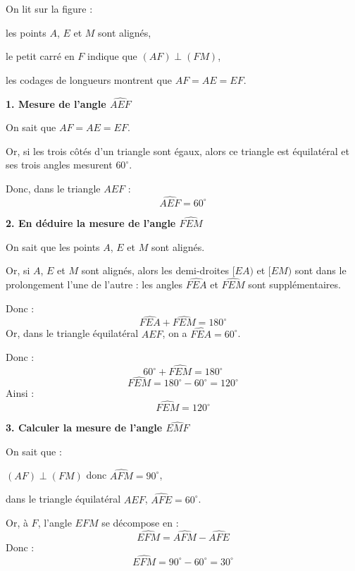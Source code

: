 \documentclass[answers]{exam}
\begin{document}
\begin{solution}

On lit sur la figure :
\begin{compactitem}
\item les points $A$, $E$ et $M$ sont alignés,
\item le petit carré en $F$ indique que $(AF)\perp(FM)$,
\item les codages de longueurs montrent que $AF=AE=EF$.
\end{compactitem}

\medskip

\textbf{1. Mesure de l'angle $\widehat{AEF}$}

On sait que $AF=AE=EF$.

Or, si les trois côtés d'un triangle sont égaux, alors ce triangle est équilatéral et ses trois angles mesurent $60^\circ$.

Donc, dans le triangle $AEF$ :
\[
\boxed{\widehat{AEF}=60^\circ}
\]

\medskip

\textbf{2. En déduire la mesure de l'angle $\widehat{FEM}$}

On sait que les points $A$, $E$ et $M$ sont alignés.

Or, si $A$, $E$ et $M$ sont alignés, alors les demi-droites $[EA)$ et $[EM)$ sont dans le prolongement l'une de l'autre : les angles $\widehat{FEA}$ et $\widehat{FEM}$ sont supplémentaires.

Donc :
\[
\widehat{FEA} + \widehat{FEM} = 180^\circ
\]
Or, dans le triangle équilatéral $AEF$, on a $\widehat{FEA}=60^\circ$.

Donc :
\[
60^\circ + \widehat{FEM} = 180^\circ
\]
\[
\widehat{FEM} = 180^\circ - 60^\circ = 120^\circ
\]
Ainsi :
\[
\boxed{\widehat{FEM}=120^\circ}
\]

\medskip

\textbf{3. Calculer la mesure de l'angle $\widehat{EMF}$}

On sait que :
\begin{compactitem}
\item $(AF)\perp(FM)$ donc $\widehat{AFM}=90^\circ$,
\item dans le triangle équilatéral $AEF$, $\widehat{AFE}=60^\circ$.
\end{compactitem}

Or, à $F$, l'angle $\widehat{EFM}$ se décompose en :
\[
\widehat{EFM} = \widehat{AFM} - \widehat{AFE}
\]
Donc :
\[
\widehat{EFM} = 90^\circ - 60^\circ = 30^\circ
\]


\end{solution}
\end{document}
